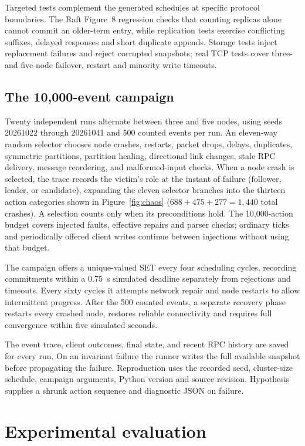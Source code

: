 \documentclass[10pt,a4paper]{article}
\begin{document}
Targeted tests complement the generated schedules at specific protocol
boundaries. The Raft Figure~8 regression checks that counting replicas alone
cannot commit an older-term entry, while replication tests exercise conflicting
suffixes, delayed responses and short duplicate appends. Storage tests inject
replacement failures and reject corrupted snapshots; real TCP tests cover
three- and five-node failover, restart and minority write timeouts.

\subsection{The 10,000-event campaign}
Twenty independent runs alternate between three and five nodes, using seeds
20261022 through 20261041 and 500 counted events per run. An eleven-way random
selector chooses node crashes, restarts, packet drops, delays, duplicates,
symmetric partitions, partition healing, directional link changes, stale RPC
delivery, message reordering, and malformed-input checks. When a node crash is
selected, the trace records the victim's role at the instant of failure
(follower, leader, or candidate), expanding the eleven selector branches into
the thirteen action categories shown in Figure~\ref{fig:chaos}
($688 + 475 + 277 = 1{,}440$ total crashes). A selection counts only when its
preconditions hold. The 10,000-action budget covers injected faults, effective
repairs and parser checks; ordinary ticks and periodically offered client writes
continue between injections without using that budget.

The campaign offers a unique-valued SET every four scheduling cycles, recording
commitments within a 0.75~s simulated deadline separately from rejections and
timeouts. Every sixty cycles it attempts network repair and node restarts to
allow intermittent progress. After the 500 counted events, a separate recovery
phase restarts every crashed node, restores reliable connectivity and requires
full convergence within five simulated seconds.

The event trace, client outcomes, final state, and recent RPC history are saved
for every run. On an invariant failure the runner writes the full available
snapshot before propagating the failure. Reproduction uses the recorded seed,
cluster-size schedule, campaign arguments, Python version and source revision.
Hypothesis supplies a shrunk action sequence and diagnostic JSON on failure.

\section{Experimental evaluation}
\end{document}

